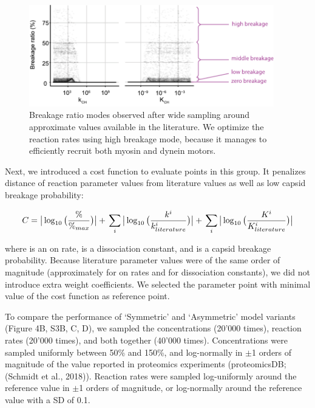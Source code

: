 \begin{figure}
\begin{center}
\includegraphics[width=0.95\textwidth, trim={0cm 0cm 0cm 0cm}, clip]{D_chapters/2_ReactionModel/ratesSelection.pdf}
\caption[Breakage ratio modes]%
{Breakage ratio modes observed after  wide sampling around approximate values available in the literature. We optimize the reaction rates using high breakage mode, because it manages to efficiently recruit both myosin and dynein motors.}
\label{figure:BreakageModesRatesSelection}
\end{center}
\end{figure}

Next, we introduced a cost function to evaluate points in this group. It penalizes distance of reaction parameter values from literature values as well as low capsid breakage probability:

\begin{equation}
C = \big| \log_{10} \big( \frac{\%}{\%_{max}} \big) \big| +\\
\sum_{i} \big| \log_{10} \big( \frac{k^i}{k^i_{literature}} \big) \big| +\\
\sum_{i} \big| \log_{10} \big( \frac{K^i}{K^i_{literature}} \big) \big|
\end{equation}

where   is an on rate,   is a dissociation constant, and   is a capsid breakage probability. Because literature parameter values were of the same order of magnitude (approximately   for on rates and   for dissociation constants), we did not introduce extra weight coefficients. We selected the parameter point with minimal value of the cost function as reference point.

To compare the performance of ‘Symmetric’ and ‘Asymmetric’ model variants (Figure 4B, S3B, C, D), we sampled the concentrations (20’000 times), reaction rates (20’000 times), and both together (40’000 times). Concentrations were sampled uniformly between 50\% and 150\%, and log-normally in $\pm$1 orders of magnitude of the value reported in proteomics experiments (proteomicsDB; (Schmidt et al., 2018)). Reaction rates were sampled log-uniformly around the reference value in $\pm$1 orders of magnitude, or log-normally around the reference value with a SD of 0.1.

